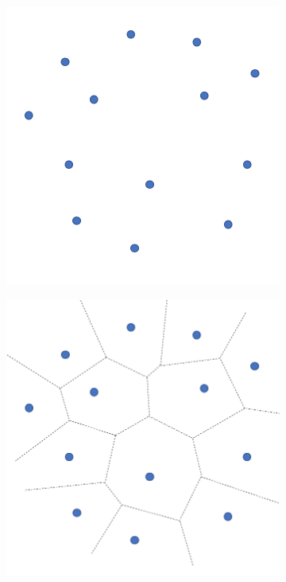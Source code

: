 \documentclass{article}
\begin{document}
\begin{figure}[h!] \label{fig:VoronoiDelaunay}
  \centering
  \begin{subfigure}[b]{0.25\linewidth}
    \includegraphics[width=\linewidth]{Fig_VoronoiDelaunay_01.png}
    \caption{}
  \end{subfigure}
  \begin{subfigure}[b]{0.25\linewidth}
    \includegraphics[width=\linewidth]{Fig_VoronoiDelaunay_02.png}

\end{subfigure}
\end{figure}
\end{document}
